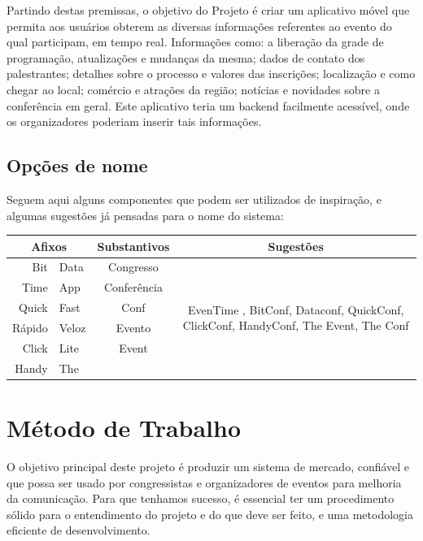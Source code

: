 \documentclass[a4paper]{abntex2}
\begin{document}
Partindo destas premissas, o objetivo do Projeto é criar um aplicativo móvel que permita aos usuários obterem as diversas informações referentes ao evento do qual participam, em tempo real. Informações como: a liberação da grade de programação, atualizações e mudanças da mesma; dados de contato dos palestrantes; detalhes sobre o processo e valores das inscrições; localização e como chegar ao local; comércio e atrações da região; notícias e novidades sobre a conferência em geral. Este aplicativo teria um backend facilmente acessível, onde os organizadores poderiam inserir tais informações.


\subsection*{Opções de nome}

Seguem aqui alguns componentes que podem ser utilizados de inspiração, e algumas sugestões já pensadas para o nome do sistema:\\

\begin{tabular}{rl|c|c}
\multicolumn{2}{c|}{\textbf{Afixos}} & \textbf{Substantivos} & \textbf{Sugestões} \\\hline
Bit		& Data	& Congresso		& \multirow{6}{6cm}{EvenTime \footnotemark, BitConf, Dataconf, QuickConf, ClickConf, HandyConf, The Event, The Conf} \\\cline{1-3}
Time	& App	& Conferência	& \\\cline{1-3}
Quick	& Fast	& Conf			& \\\cline{1-3}
Rápido	& Veloz	& Evento		& \\\cline{1-3}
Click	& Lite	& Event			& \\\cline{1-3}
Handy	& The	& 				& \\
\end{tabular}


\section{Método de Trabalho}
O objetivo principal deste projeto é produzir um sistema de mercado, confiável e que possa ser usado por congressistas e organizadores de eventos para melhoria da comunicação. Para que tenhamos sucesso, é essencial ter um procedimento sólido para o entendimento do projeto e do que deve ser feito, e uma metodologia eficiente de desenvolvimento.
\end{document}
